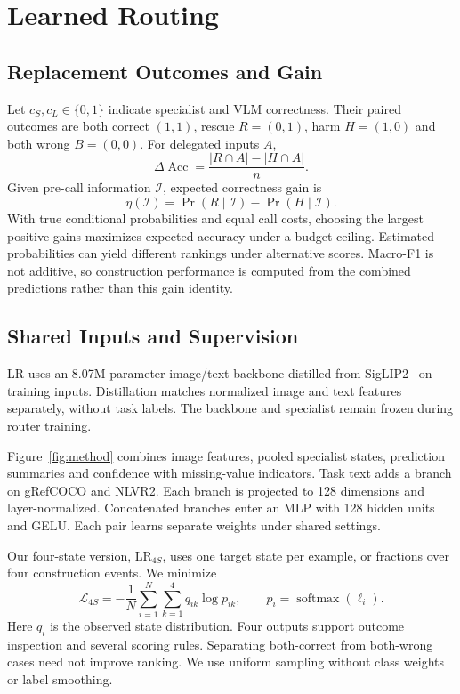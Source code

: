 \section{Learned Routing}
\label{sec:method}
\subsection{Replacement Outcomes and Gain}
Let $c_S,c_L\in\{0,1\}$ indicate specialist and VLM correctness. Their paired outcomes are both correct $(1,1)$, rescue $R=(0,1)$, harm $H=(1,0)$ and both wrong $B=(0,0)$. For delegated inputs $A$,
\begin{equation}
\Delta\operatorname{Acc}=\frac{|R\cap A|-|H\cap A|}{n}.
\label{eq:decomposition}
\end{equation}
Given pre-call information $\mathcal I$, expected correctness gain is
\begin{equation}
\eta(\mathcal I)=\Pr(R\mid\mathcal I)-\Pr(H\mid\mathcal I).
\label{eq:utility}
\end{equation}
With true conditional probabilities and equal call costs, choosing the largest positive gains maximizes expected accuracy under a budget ceiling. Estimated probabilities can yield different rankings under alternative scores. Macro-F1 is not additive, so construction performance is computed from the combined predictions rather than this gain identity.

\subsection{Shared Inputs and Supervision}
LR uses an 8.07M-parameter image/text backbone distilled from SigLIP2~\cite{siglip2} on training inputs. Distillation matches normalized image and text features separately, without task labels. The backbone and specialist remain frozen during router training.

Figure~\ref{fig:method} combines image features, pooled specialist states, prediction summaries and confidence with missing-value indicators. Task text adds a branch on gRefCOCO and NLVR2. Each branch is projected to 128 dimensions and layer-normalized. Concatenated branches enter an MLP with 128 hidden units and GELU. Each pair learns separate weights under shared settings.

Our four-state version, $\mathrm{LR}_{4S}$, uses one target state per example, or fractions over four construction events. We minimize
\begin{equation}
\mathcal L_{4S}=-\frac1N\sum_{i=1}^{N}\sum_{k=1}^{4}q_{ik}\log p_{ik},
\qquad p_i=\operatorname{softmax}(\ell_i).
\label{eq:loss}
\end{equation}
Here $q_i$ is the observed state distribution. Four outputs support outcome inspection and several scoring rules. Separating both-correct from both-wrong cases need not improve ranking. We use uniform sampling without class weights or label smoothing.

